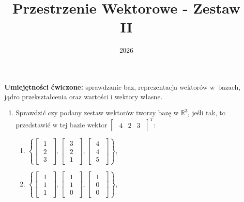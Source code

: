 \documentclass{article}
\title{Przestrzenie Wektorowe - Zestaw II}
\date{2026}
\begin{document}
\maketitle

\begin{center}
\textbf{Umiejętności ćwiczone:} sprawdzanie baz, reprezentacja wektorów w~bazach, jądro przekształcenia oraz wartości i wektory własne.
\end{center}



\begin{enumerate}
    \item Sprawdzić czy podany zestaw wektorów tworzy bazę w $\mathbb{R}^{3}$, jeśli tak, to przedstawić w tej bazie wektor $\begin{bmatrix}\begin{array}{rrr} 4 & 2 & 3 \end{array}\end{bmatrix}^{T}$:
        \begin{enumerate}
            \item $\left\{ \begin{bmatrix}\begin{array}{c} 1\\ 2\\ 3 \end{array}\end{bmatrix},          \begin{bmatrix}\begin{array}{c} 3\\ 2\\ 1 \end{array}\end{bmatrix}, 
            \begin{bmatrix}\begin{array}{c} 4\\ 4\\ 5 \end{array}\end{bmatrix}\right\}$,
            
            \item $\left\{ \begin{bmatrix}\begin{array}{c} 1\\ 1\\ 1 \end{array}\end{bmatrix},          \begin{bmatrix}\begin{array}{c} 1\\ 1\\ 0 \end{array}\end{bmatrix}, 
            \begin{bmatrix}\begin{array}{c} 1\\ 0\\ 0 \end{array}\end{bmatrix}\right\}$,


\end{enumerate}
\end{enumerate}
\end{document}
